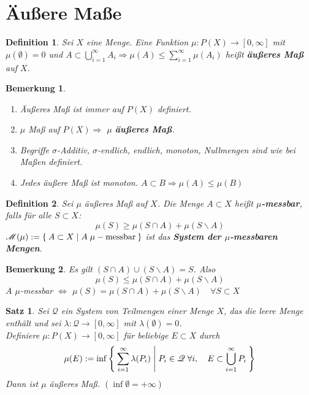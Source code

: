 \documentclass[11pt]{memoir}
\theoremstyle{changebreak}
\newtheorem{Definition}{Definition}[chapter]
\newtheorem{Bemerkung}{Bemerkung}[chapter]
\newtheorem{Satz}{Satz}[chapter]
\begin{document}
\section{Äußere Maße}

\begin{Definition}
Sei $X$ eine Menge. Eine Funktion $\mu: P(X) \rightarrow [0, \infty]$ mit $\mu(\emptyset) = 0$ und $A \subset \bigcup\limits_{i=1}^\infty A_i \Rightarrow \mu(A) \leq \sum\limits_{i=1}^\infty \mu(A_i)$ heißt \textbf{äußeres Maß} auf $X$.
\end{Definition}

\begin{Bemerkung}
\begin{enumerate}
	\item Äußeres Maß ist immer auf $P(X)$ definiert.
	\item $\mu$ Maß auf $P(X) \Rightarrow$ $\mu$ \textbf{äußeres Maß}.
	\item Begriffe $\sigma$-Additiv, $\sigma$-endlich, endlich, monoton, Nullmengen sind wie bei Maßen definiert.
	\item Jedes äußere Maß ist monoton. $A \subset B \Rightarrow \mu(A) \leq \mu(B)$
\end{enumerate}
\end{Bemerkung}

\begin{Definition}
Sei $\mu$ äußeres Maß auf $X$. Die Menge $A \subset X$ heißt \textbf{$\mu$-messbar}, falls für alle $S \subset X$: 
$$\mu(S) \geq \mu(S \cap A) + \mu(S \backslash A)$$
$\mathscr M(\mu):= \Set{ A \subset X | A \;  \mu-\text{messbar} }$ ist das \textbf{System der $\mu$-messbaren Mengen}.
\end{Definition}

\begin{Bemerkung}
Es gilt $(S \cap A) \cup (S \backslash A) = S$. Also 
$$\mu(S) \leq \mu(S \cap A) + \mu(S \backslash A)$$
$A$ $\mu$-messbar $\Leftrightarrow$ $\mu(S) = \mu(S \cap A) + \mu(S \backslash A)\quad \forall S \subset X$
\end{Bemerkung}

\begin{Satz}
Sei $\mathscr Q$ ein System von Teilmengen einer Menge $X$, das die leere Menge enthält und 
sei $\lambda: \mathscr Q \rightarrow [0, \infty]$ mit $\lambda(\emptyset) = 0$.\\
Definiere $\mu: P(X) \rightarrow [0, \infty]$ für beliebige $E \subset X$ durch 
$$\mu(E) := \inf \Set{ \sum\limits_{i=1}^\infty \lambda(P_i) | P_i \in \mathscr Q \; \forall i,\quad  E \subset \bigcup\limits_{i=1}^\infty P_i }$$
Dann ist $\mu$ äußeres Maß. $(\inf \emptyset = + \infty)$
\end{Satz}
\end{document}
